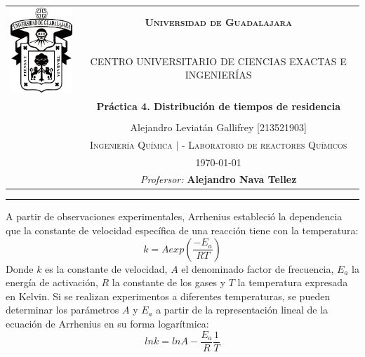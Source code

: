 \documentclass[12pt,letterpaper]{article}
\begin{document}
\renewcommand{\tablename}{Tabla}
\thispagestyle{empty}
\sloppy     %
\begin{center}
  \begin{tabular}{cc}

\multirow{2}{3.5cm}{\includegraphics[width=3cm]{Figuras/udg.pdf}}	& \huge{\textsc{\textbf{Universidad de Guadalajara}}}\\
 & \scriptsize{\textsc{CENTRO UNIVERSITARIO DE CIENCIAS EXACTAS E INGENIERÍAS}}\\[5mm]
 & \Large{\textsf{\textbf{Práctica 4. Distribución de tiempos de residencia
}}}\\
 & \\ \vspace{5mm}
 & \small{\textsf{Alejandro Leviatán Gallifrey  [213521903]}}\\
 & \small{\textsc{Ingeniería Química $|$  - Laboratorio de reactores Químicos}}\\
 & \today\\
 & \small{\textit{Profersor:}}  \textbf{\small{Alejandro Nava Tellez }}\\
  \end{tabular}
\end{center}


\rule{\linewidth}{0.75mm}

\tableofcontents
A partir de observaciones experimentales, Arrhenius estableció la dependencia que la
constante de velocidad específica de una reacción tiene con la temperatura:
\[k=A exp \left( \frac{-E_{a}}{RT}\right ) \]
Donde $k$ es la constante de velocidad, $A$ el denominado factor de frecuencia, $E_a$ la
energía de activación, $R$ la constante de los gases y $T$ la temperatura expresada en
Kelvin. Si se realizan experimentos a diferentes temperaturas, se pueden determinar
los parámetros $A$ y $E_a$ a partir de la representación lineal de la ecuación de Arrhenius
en su forma logarítmica:
$$ ln k =ln A - \dfrac{E_a}{R} \dfrac{1}{T} $$
%
%
%
\end{document}
